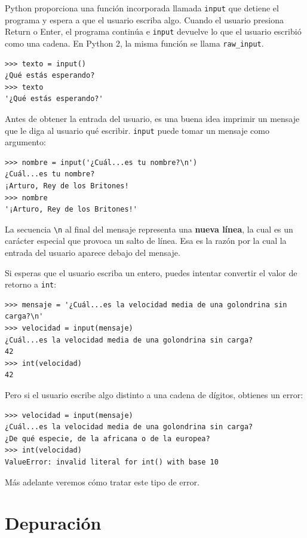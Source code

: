 \documentclass[10pt]{book}
\begin{document}
Python proporciona una función incorporada llamada {\tt input} que
detiene el programa y
espera a que el usuario escriba algo.  Cuando el usuario presiona {\sf
  Return} o {\sf Enter}, el programa continúa e \verb"input"
devuelve lo que el usuario escribió como una cadena.  En Python 2, la misma
función se llama \verb"raw_input".

\begin{verbatim}
>>> texto = input()
¿Qué estás esperando?
>>> texto
'¿Qué estás esperando?'
\end{verbatim}
%
Antes de obtener la entrada del usuario, es una buena idea imprimir
un mensaje que le diga al usuario qué escribir.  \verb"input" puede tomar un
mensaje como argumento:

\begin{verbatim}
>>> nombre = input('¿Cuál...es tu nombre?\n')
¿Cuál...es tu nombre?
¡Arturo, Rey de los Britones!
>>> nombre
'¡Arturo, Rey de los Britones!'
\end{verbatim}
%
La secuencia \verb"\n" al final del mensaje representa una {\bf
  nueva línea}, la cual es un carácter especial que provoca un salto de línea.
Esa es la razón por la cual la entrada del usuario aparece debajo del mensaje.  

Si esperas que el usuario escriba un entero, puedes intentar convertir
el valor de retorno a {\tt int}:

\begin{verbatim}
>>> mensaje = '¿Cuál...es la velocidad media de una golondrina sin carga?\n'
>>> velocidad = input(mensaje)
¿Cuál...es la velocidad media de una golondrina sin carga?
42
>>> int(velocidad)
42
\end{verbatim}
%
Pero si el usuario escribe algo distinto a una cadena de dígitos,
obtienes un error:

\begin{verbatim}
>>> velocidad = input(mensaje)
¿Cuál...es la velocidad media de una golondrina sin carga?
¿De qué especie, de la africana o de la europea?
>>> int(velocidad)
ValueError: invalid literal for int() with base 10
\end{verbatim}
%
Más adelante veremos cómo tratar este tipo de error.


\section{Depuración}
\label{whitespace}
\end{document}
